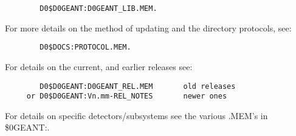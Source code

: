 \begin{verbatim}
        D0$D0GEANT:D0GEANT_LIB.MEM.
\end{verbatim}

For more details on the method of updating and the directory protocols, see:

\begin{verbatim}
        D0$DOCS:PROTOCOL.MEM.
\end{verbatim}

For details on the current, and earlier releases see:

\begin{verbatim}
        D0$D0GEANT:D0GEANT_REL.MEM       old releases
     or D0$D0GEANT:Vn.mm-REL_NOTES       newer ones
\end{verbatim}

For details on specific detectors/subsystems see the various .MEM's in
\$\D0GEANT:.


